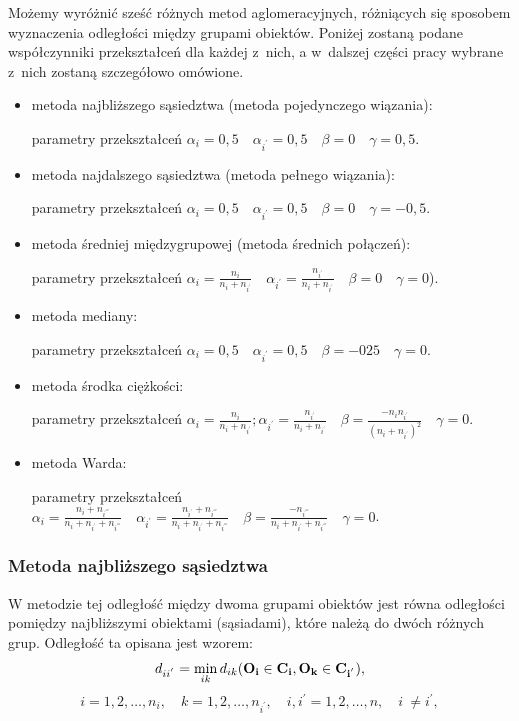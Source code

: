 \documentclass[12pt,a4paper]{report}
\begin{document}
Możemy wyróżnić sześć różnych metod aglomeracyjnych, różniących się sposobem wyznaczenia odległości między grupami obiektów. Poniżej zostaną podane współczynniki przekształceń dla każdej z~nich, a w~dalszej części pracy wybrane z~nich zostaną szczegółowo omówione.
\begin{itemize}
\item metoda najbliższego sąsiedztwa (metoda pojedynczego wiązania):

parametry  przekształceń $\alpha_{i}=0,5 \quad \alpha_{i^{'}}=0,5 \quad  \beta=0 \quad \gamma=0,5$.
\item metoda najdalszego sąsiedztwa (metoda pełnego wiązania):

parametry  przekształceń $\alpha_{i}=0,5 \quad \alpha_{i^{'}}=0,5 \quad \beta=0 \quad \gamma=-0,5$.
\item metoda średniej międzygrupowej (metoda średnich połączeń):

parametry  przekształceń $\alpha_{i}=\frac{n_{i}}{n_{i} + n_{i^{'}}} \quad \alpha_{i^{'}}=\frac{n_{i^{'}}}{n_{i} + n_{i^{'}}} \quad \beta=0 \quad \gamma=0$).
\item metoda mediany:

parametry  przekształceń $\alpha_{i}=0,5 \quad \alpha_{i^{'}}=0,5 \quad \beta=-025 \quad \gamma=0$.
\item metoda środka ciężkości:

parametry  przekształceń $\alpha_{i}=\frac{n_{i}}{n_{i} + n_{i^{'}}}; \alpha_{i^{'}}=\frac{n_{i^{'}}}{n_{i} + n_{i^{'}}} \quad \beta=\frac{-n_{i}n_{i^{'}}}{(n_{i} + n_{i^{'}})^{2}} \quad \gamma=0$.
\item metoda Warda:

parametry  przekształceń $\alpha_{i}=\frac{n_{i}+n_{i^{'''}}}{n_{i} + n_{i^{'}}+n_{i^{'''}}} \quad \alpha_{i^{'}}=\frac{n_{i^{'}}+n_{i^{'''}}}{n_{i} + n_{i^{'}}+n_{i^{'''}}} \quad \beta=\frac{-n_{i^{'''}}}{n_{i} + n_{i^{'}}+n_{i^{'''}}} \quad \gamma=0$.

\end{itemize}
 
\subsubsection{Metoda najbliższego sąsiedztwa}


W metodzie tej odległość między dwoma grupami obiektów jest równa odległości pomiędzy najbliższymi obiektami (sąsiadami), które należą do dwóch różnych grup. Odległość ta opisana jest wzorem:
$$
d_{ii^{'}}= \min\limits_{ik} {d_{ik}(\bf{O_i} \in C_{i}, O_{k} \in C_{i^{'}})},
$$
$$
i=1,2,\dots,n_{i}, \quad k=1,2,\dots,n_{i^{'}}, \quad i,i^{'}=1,2,\dots,n, \quad i~\neq i^{'}, 
$$
\end{document}
